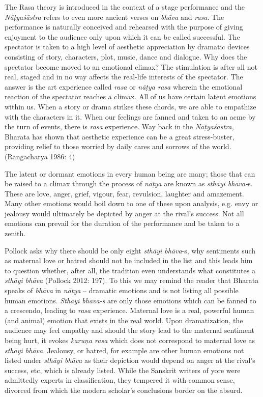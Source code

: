 The Rasa theory is introduced in the context of a stage performance and the \textit{Nāṭyaśāstra }refers to even more ancient verses on \textit{bhāva} and \textit{rasa}. The performance is naturally conceived and rehearsed with the purpose of giving enjoyment to the audience only upon which it can be called successful. The spectator is taken to a high level of aesthetic appreciation by dramatic devices consisting of story, characters, plot, music, dance and dialogue. Why does the spectator become moved to an emotional climax? The stimulation is after all not real, staged and in no way affects the real-life interests of the spectator. The answer is the art experience called \textit{rasa} or \textit{nāṭya rasa} wherein the emotional reaction of the spectator reaches a climax. All of us have certain latent emotions within us. When a story or drama strikes these chords, we are able to empathize with the characters in it. When our feelings are fanned and taken to an acme by the turn of events, there is \textit{rasa} experience. Way back in the \textit{Nāṭyaśāstra,} Bharata has shown that aesthetic experience can be a great stress-buster, providing relief to those worried by daily cares and sorrows of the world. (Rangacharya 1986: 4)

The latent or dormant emotions in every human being are many; those that can be raised to a climax through the process of \textit{nāṭya} are known as \textit{sthāyi bhāva-}s. These are love, anger, grief, vigour, fear, revulsion, laughter and amazement. Many other emotions would boil down to one of these upon analysis, e.g. envy or jealousy would ultimately be depicted by anger at the rival’s success. Not all emotions can prevail for the duration of the performance and be taken to a zenith.

Pollock asks why there should be only eight \textit{sthāyi bhāva}-s, why sentiments such as maternal love or hatred should not be included in the list and this leads him to question whether, after all, the tradition even understands what constitutes a \textit{sthāyi bhāva }(Pollock 2012: 197). To this we may remind the reader that Bharata speaks of \textit{bhāva} in \textit{nāṭya} – dramatic emotions and is not listing all possible human emotions. \textit{Sthāyi bhāva-s} are only those emotions which can be fanned to a crescendo, leading to \textit{rasa} experience. Maternal love is a real, powerful human (and animal) emotion that exists in the real world. Upon dramatization, the audience may feel empathy and should the story lead to the maternal sentiment being hurt, it evokes \textit{karuṇa rasa} which does not correspond to maternal love as \textit{sthāyi bhāva}. Jealousy, or hatred, for example are other human emotions not listed under \textit{sthāyi bhāva} as their depiction would depend on anger at the rival’s success, etc, which is already listed. While the Sanskrit writers of yore were admittedly experts in classification, they tempered it with common sense, divorced from which the modern scholar’s conclusions border on the absurd.

